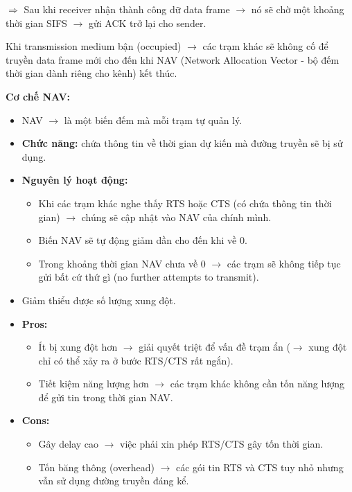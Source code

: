 \noindent
$\Rightarrow$ Sau khi receiver nhận thành công dữ data frame $\rightarrow$ nó sẽ chờ một khoảng thời gian SIFS $\rightarrow$ gửi ACK trở lại cho sender.
\medskip

\noindent
Khi transmission medium bận (occupied) $\rightarrow$ các trạm khác sẽ không cố để truyền data frame mới cho đến khi NAV (Network Allocation Vector - bộ đếm thời gian dành riêng cho kênh) kết thúc.
\medskip

\noindent
\textbf{Cơ chế NAV:}

\begin{itemize}
    \item NAV $\rightarrow$ là một biến đếm mà mỗi trạm tự quản lý.
    \item \textbf{Chức năng:} chứa thông tin về thời gian dự kiến mà đường truyền sẽ bị sử dụng.
    \item \textbf{Nguyên lý hoạt động:} \begin{itemize}
        \item Khi các trạm khác nghe thấy RTS hoặc CTS (có chứa thông tin thời gian) $\rightarrow$ chúng sẽ cập nhật vào NAV của chính mình.
        \item Biến NAV sẽ tự động giảm dần cho đến khi về 0.
        \item Trong khoảng thời gian NAV chưa về 0 $\rightarrow$ các trạm sẽ không tiếp tục gửi bất cứ thứ gì (no further attempts to transmit).
    \end{itemize}
    \item[$\Rightarrow$] Giảm thiểu được số lượng xung đột.
\end{itemize}
\medskip

\noindent
\begin{itemize}
    \item \textbf{Pros:} \begin{itemize}
        \item Ít bị xung đột hơn $\rightarrow$ giải quyết triệt để vấn đề trạm ẩn ($\rightarrow$ xung đột chỉ có thể xảy ra ở bước RTS/CTS rất ngắn).
        \item Tiết kiệm năng lượng hơn $\rightarrow$ các trạm khác không cần tốn năng lượng để gửi tin trong thời gian NAV.
    \end{itemize}
    \item \textbf{Cons:} \begin{itemize}
        \item Gây delay cao $\rightarrow$ việc phải xin phép RTS/CTS gây tốn thời gian.
        \item Tốn băng thông (overhead) $\rightarrow$ các gói tin RTS và CTS tuy nhỏ nhưng vẫn sử dụng đường truyền đáng kể.
    \end{itemize}
\end{itemize}
\medskip

